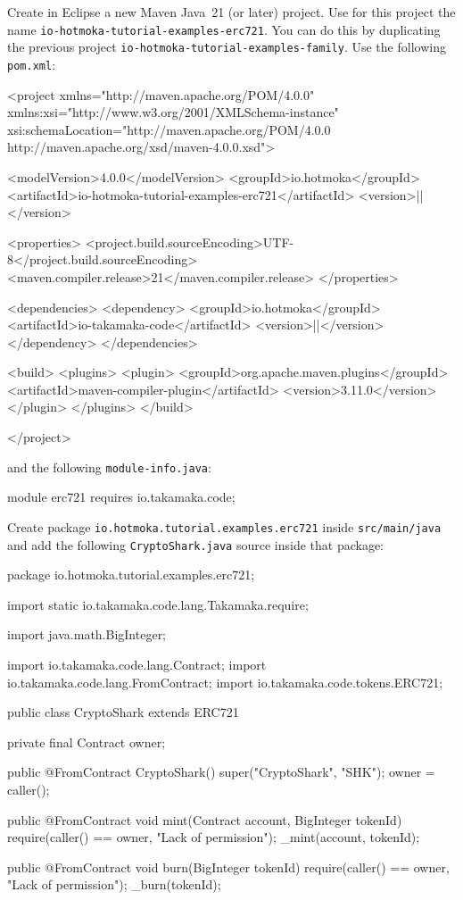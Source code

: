 Create in Eclipse a new Maven Java~21 (or later) project. Use for this project the name
\texttt{io-hotmoka-tutorial-examples-erc721}.
You can do this by duplicating the previous project \texttt{io-hotmoka-tutorial-examples-family}.
Use the following \texttt{pom.xml}:
%
\begin{codebox}\begin{xmllst}
<project xmlns="http://maven.apache.org/POM/4.0.0"
    xmlns:xsi="http://www.w3.org/2001/XMLSchema-instance"
    xsi:schemaLocation="http://maven.apache.org/POM/4.0.0 http://maven.apache.org/xsd/maven-4.0.0.xsd">

  <modelVersion>4.0.0</modelVersion>
  <groupId>io.hotmoka</groupId>
  <artifactId>io-hotmoka-tutorial-examples-erc721</artifactId>
  <version>|\hotmokaVersion{}|</version>

  <properties>
    <project.build.sourceEncoding>UTF-8</project.build.sourceEncoding>
    <maven.compiler.release>21</maven.compiler.release>
  </properties>

  <dependencies>
    <dependency>
      <groupId>io.hotmoka</groupId>
      <artifactId>io-takamaka-code</artifactId>
      <version>|\takamakaVersion{}|</version>
    </dependency>
  </dependencies>

  <build>
    <plugins>
      <plugin>
        <groupId>org.apache.maven.plugins</groupId>
        <artifactId>maven-compiler-plugin</artifactId>
        <version>3.11.0</version>
      </plugin>
    </plugins>
  </build>

</project>
\end{xmllst}\end{codebox}
%
and the following \texttt{module-info.java}:
%
\begin{codebox}\begin{javalst}
module erc721 {
  requires io.takamaka.code;
}
\end{javalst}\end{codebox}
%
Create package \texttt{io.hotmoka.tutorial.examples.erc721}
inside \texttt{src/main/java} and add
the following \texttt{CryptoShark.java} source inside that package:
%
\begin{codebox}\begin{javalst}
package io.hotmoka.tutorial.examples.erc721;

import static io.takamaka.code.lang.Takamaka.require;

import java.math.BigInteger;

import io.takamaka.code.lang.Contract;
import io.takamaka.code.lang.FromContract;
import io.takamaka.code.tokens.ERC721;

public class CryptoShark extends ERC721 {
  private final Contract owner;

  public @FromContract CryptoShark() {
    super("CryptoShark", "SHK");
    owner = caller();
  }

  public @FromContract void mint(Contract account, BigInteger tokenId) {
    require(caller() == owner, "Lack of permission");
    _mint(account, tokenId);
  }

  public @FromContract void burn(BigInteger tokenId) {
    require(caller() == owner, "Lack of permission");
    _burn(tokenId);
  }
}
\end{javalst}\end{codebox}

